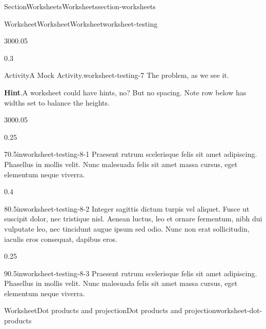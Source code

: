 \documentclass[oneside,10pt,]{article}
\newcommand{\blocktitlefont}{\relax}
\numberwithin{equation}{section}
\begin{document}
\begin{sectionptx}{Section}{Worksheets}{}{Worksheets}{}{}{section-worksheets}
\begin{worksheet-subsection}{Worksheet}{Worksheet}{}{Worksheet}{}{}{worksheet-testing}
\begin{sidebyside}{3}{0}{0}{0.05}
\begin{sbspanel}{0.3}
\end{sbspanel}%
\end{sidebyside}%
\begin{activity}{Activity}{A Mock Activity.}{worksheet-testing-7}%
The problem, as we see it.%
\par\smallskip%
\noindent\textbf{\blocktitlefont Hint}.\hypertarget{worksheet-testing-7-3}{}\quad{}A worksheet could have hints, no?  But no spacing. Note row below has widths set to balance the heights.%
\end{activity}%
\begin{sidebyside}{3}{0}{0}{0.05}%
\begin{sbspanel}{0.25}%
\begin{divisionexercise}{7}{}{0.5in}{worksheet-testing-8-1}%
Praesent rutrum scelerisque felis sit amet adipiscing. Phasellus in mollis velit. Nunc malesuada felis sit amet massa cursus, eget elementum neque viverra.%
\end{divisionexercise}%
\end{sbspanel}%
\begin{sbspanel}{0.4}%
\begin{divisionexercise}{8}{}{0.5in}{worksheet-testing-8-2}%
Integer sagittis dictum turpis vel aliquet. Fusce ut suscipit dolor, nec tristique nisl. Aenean luctus, leo et ornare fermentum, nibh dui vulputate leo, nec tincidunt augue ipsum sed odio. Nunc non erat sollicitudin, iaculis eros consequat, dapibus eros.%
\end{divisionexercise}%
\end{sbspanel}%
\begin{sbspanel}{0.25}%
\begin{divisionexercise}{9}{}{0.5in}{worksheet-testing-8-3}%
Praesent rutrum scelerisque felis sit amet adipiscing. Phasellus in mollis velit. Nunc malesuada felis sit amet massa cursus, eget elementum neque viverra.%
\end{divisionexercise}%
\end{sbspanel}%
\end{sidebyside}%
\end{worksheet-subsection}
\restoregeometry
%
%
\typeout{************************************************}
\typeout{************************************************}
%
\begin{worksheet-subsection}{Worksheet}{Dot products and projection}{}{Dot products and projection}{}{}{worksheet-dot-products}

\end{worksheet-subsection}
\end{sectionptx}
\end{document}
